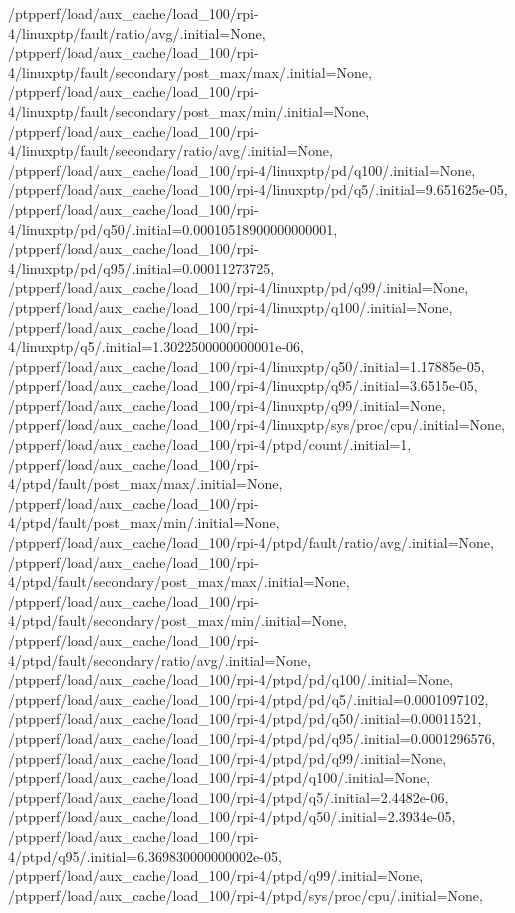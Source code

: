 {    /ptpperf/load/aux_cache/load_100/rpi-4/linuxptp/fault/ratio/avg/.initial=None,
    /ptpperf/load/aux_cache/load_100/rpi-4/linuxptp/fault/secondary/post_max/max/.initial=None,
    /ptpperf/load/aux_cache/load_100/rpi-4/linuxptp/fault/secondary/post_max/min/.initial=None,
    /ptpperf/load/aux_cache/load_100/rpi-4/linuxptp/fault/secondary/ratio/avg/.initial=None,
    /ptpperf/load/aux_cache/load_100/rpi-4/linuxptp/pd/q100/.initial=None,
    /ptpperf/load/aux_cache/load_100/rpi-4/linuxptp/pd/q5/.initial=9.651625e-05,
    /ptpperf/load/aux_cache/load_100/rpi-4/linuxptp/pd/q50/.initial=0.00010518900000000001,
    /ptpperf/load/aux_cache/load_100/rpi-4/linuxptp/pd/q95/.initial=0.00011273725,
    /ptpperf/load/aux_cache/load_100/rpi-4/linuxptp/pd/q99/.initial=None,
    /ptpperf/load/aux_cache/load_100/rpi-4/linuxptp/q100/.initial=None,
    /ptpperf/load/aux_cache/load_100/rpi-4/linuxptp/q5/.initial=1.3022500000000001e-06,
    /ptpperf/load/aux_cache/load_100/rpi-4/linuxptp/q50/.initial=1.17885e-05,
    /ptpperf/load/aux_cache/load_100/rpi-4/linuxptp/q95/.initial=3.6515e-05,
    /ptpperf/load/aux_cache/load_100/rpi-4/linuxptp/q99/.initial=None,
    /ptpperf/load/aux_cache/load_100/rpi-4/linuxptp/sys/proc/cpu/.initial=None,
    /ptpperf/load/aux_cache/load_100/rpi-4/ptpd/count/.initial=1,
    /ptpperf/load/aux_cache/load_100/rpi-4/ptpd/fault/post_max/max/.initial=None,
    /ptpperf/load/aux_cache/load_100/rpi-4/ptpd/fault/post_max/min/.initial=None,
    /ptpperf/load/aux_cache/load_100/rpi-4/ptpd/fault/ratio/avg/.initial=None,
    /ptpperf/load/aux_cache/load_100/rpi-4/ptpd/fault/secondary/post_max/max/.initial=None,
    /ptpperf/load/aux_cache/load_100/rpi-4/ptpd/fault/secondary/post_max/min/.initial=None,
    /ptpperf/load/aux_cache/load_100/rpi-4/ptpd/fault/secondary/ratio/avg/.initial=None,
    /ptpperf/load/aux_cache/load_100/rpi-4/ptpd/pd/q100/.initial=None,
    /ptpperf/load/aux_cache/load_100/rpi-4/ptpd/pd/q5/.initial=0.0001097102,
    /ptpperf/load/aux_cache/load_100/rpi-4/ptpd/pd/q50/.initial=0.00011521,
    /ptpperf/load/aux_cache/load_100/rpi-4/ptpd/pd/q95/.initial=0.0001296576,
    /ptpperf/load/aux_cache/load_100/rpi-4/ptpd/pd/q99/.initial=None,
    /ptpperf/load/aux_cache/load_100/rpi-4/ptpd/q100/.initial=None,
    /ptpperf/load/aux_cache/load_100/rpi-4/ptpd/q5/.initial=2.4482e-06,
    /ptpperf/load/aux_cache/load_100/rpi-4/ptpd/q50/.initial=2.3934e-05,
    /ptpperf/load/aux_cache/load_100/rpi-4/ptpd/q95/.initial=6.369830000000002e-05,
    /ptpperf/load/aux_cache/load_100/rpi-4/ptpd/q99/.initial=None,
    /ptpperf/load/aux_cache/load_100/rpi-4/ptpd/sys/proc/cpu/.initial=None,
}
